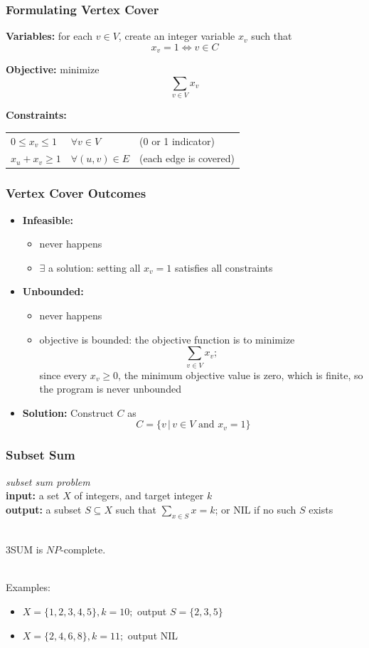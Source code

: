 \documentclass[10pt,aspectratio=169]{beamer}
\newcommand{\stanza}{ \\~\ }
\begin{document}
\begin{frame} \frametitle{Formulating Vertex Cover}
\textbf{Variables:} for each $v \in V$, create an integer variable $x_v$ such that
\[ x_v = 1 \Leftrightarrow v \in C \]

\textbf{Objective:} minimize
\[ \sum_{v \in V} x_v \]

\textbf{Constraints:}
\begin{tabular}{lll}
  $0 \leq x_v \leq 1$ & $\forall v \in V$ & (0 or 1 indicator) \\
  $x_u + x_v \geq 1$ & $\forall (u, v) \in E$ & (each edge is covered)
\end{tabular}
\end{frame}

\begin{frame} \frametitle{Vertex Cover Outcomes}
  \begin{itemize}
    \item \textbf{Infeasible:}
      \begin{itemize}
      \item never happens
      \item $\exists$ a solution: setting all $x_v=1$ satisfies all constraints
      \end{itemize}
    \item \textbf{Unbounded:}
    \begin{itemize}
      \item never happens
      \item objective is bounded: the objective function is to minimize 
        \[ \sum_{v \in V} x_v; \]
        since every $x_v \geq 0$, the minimum objective value is zero, which is finite, so the program is never unbounded
    \end{itemize}
    \item \textbf{Solution:} Construct $C$ as
      \[ C = \{ v \,|\, v \in V \text{ and } x_v=1 \} \]
    \end{itemize}
  \end{frame}


\begin{frame} \frametitle{Subset Sum}
  \emph{subset sum problem} \\
  \textbf{input:} a set $X$ of integers, and target integer $k$ \\
  \textbf{output:} a subset $S \subseteq X$ such that $\sum_{x \in S} x = k$; or NIL if no such $S$ exists
  \stanza

   3SUM is $NP$-complete.
   \stanza

  Examples:
  \begin{itemize}
    \item $X = \{1, 2, 3, 4, 5\}, k=10;$ output $S=\{2, 3, 5\}$
    \item $X = \{2, 4, 6, 8\}, k=11;$ output NIL
  \end{itemize}
\end{frame}
\end{document}
